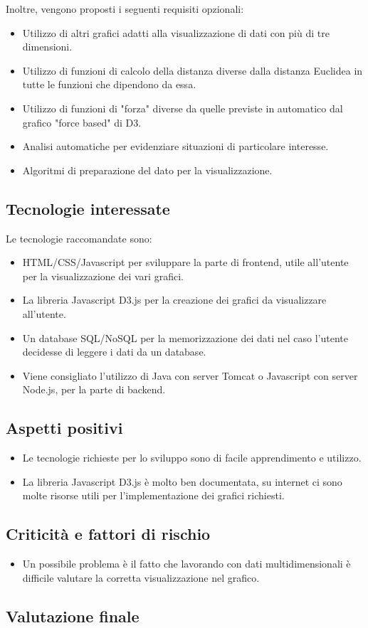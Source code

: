 Inoltre, vengono proposti i seguenti requisiti opzionali:
\begin{itemize}
\item Utilizzo di altri grafici adatti alla visualizzazione di dati con più di tre dimensioni.
\item Utilizzo di funzioni di calcolo della distanza diverse dalla distanza Euclidea in tutte le funzioni che dipendono da essa.
\item Utilizzo di funzioni di "forza" diverse da quelle previste in automatico dal grafico "force based" di D3.
\item Analisi automatiche per evidenziare situazioni di particolare interesse.
\item Algoritmi di preparazione del dato per la visualizzazione.
\end{itemize}

\subsection{Tecnologie interessate}
Le tecnologie raccomandate sono:
\begin{itemize}
\item HTML/CSS/Javascript per sviluppare la parte di frontend, utile all’utente per la visualizzazione dei vari grafici.
\item La libreria Javascript D3.js per la creazione dei grafici da visualizzare all'utente.
\item Un database SQL/NoSQL per la memorizzazione dei dati nel caso l’utente decidesse di leggere i dati da un database.
\item Viene consigliato l’utilizzo di Java con server Tomcat o Javascript con server Node.js, per la parte di backend.
\end{itemize}

\subsection{Aspetti positivi}
\begin{itemize}
\item Le tecnologie richieste per lo sviluppo sono di facile apprendimento e utilizzo.
\item La libreria Javascript D3.js è molto ben documentata, su internet ci sono molte risorse utili per l'implementazione dei grafici richiesti.
\end{itemize}

\subsection{Criticità e fattori di rischio}
\begin{itemize}
\item Un possibile problema è il fatto che lavorando con dati multidimensionali è difficile valutare la corretta visualizzazione nel grafico.
\end{itemize}

\subsection{Valutazione finale}